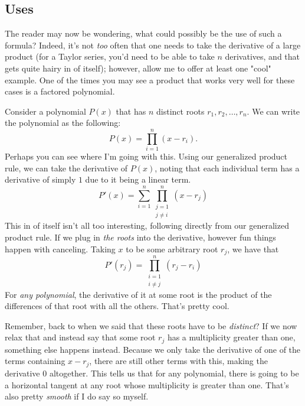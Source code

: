 \subsection{Uses}
The reader may now be wondering, what could possibly be the use of such a formula? Indeed, it's not \textit{too} often that one needs to take the derivative of a large product (for a Taylor series, you'd need to be able to take \( n \) derivatives, and that gets quite hairy in of itself); however, allow me to offer at least one "cool"  example. One of the times you may see a product that works very well for these cases is a factored polynomial.

Consider a polynomial \( P \left( x \right) \) that has \( n \) distinct  roots \( r_1,r_2,\ldots,r_n \). We can write the polynomial as the following:
\[
    P \left( x \right) = \prod_{i=1}^{n} \left( x - r_i \right)
.\]
Perhaps you can see where I'm going with this. Using our generalized product rule, we can take the derivative of \( P \left( x \right) \), noting that each individual term has a derivative of simply \( 1 \) due to it being a linear term.
\[
    P' \left( x \right) = \sum_{i = 1}^{n} \prod_{\substack{j = 1 \\ j \ne i}}^{n} \left( x - r_j \right)
\]
This in of itself isn't all too interesting, following directly from our generalized product rule. If we plug in \textit{the roots} into the derivative, however fun things happen with canceling. Taking \( x \) to be some arbitrary root \( r_j \), we have that
\[
    P' \left( r_j \right) = \prod_{\substack{i = 1 \\ i \ne j}}^{n} \left( r_j - r_i \right)
\]
For \textit{any polynomial}, the derivative of it at some root is the product of the differences of that root with all the others. That's pretty cool.

Remember, back to when we said that these roots have to be \textit{distinct}? If we now relax that and instead say that some root \( r_j \) has a multiplicity greater than one, something else happens instead. Because we only take the derivative of one of the terms containing \( x - r_j \), there are still other terms with this, making the derivative \( 0 \) altogether. This tells us that for any polynomial, there is going to be a horizontal tangent at any root whose multiplicity is greater than one. That's also pretty \textit{smooth} if I do say so myself.
